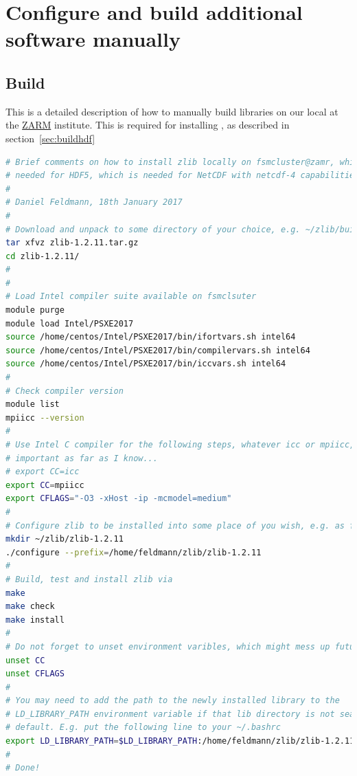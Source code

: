 \documentclass[a4paper, 11pt, DIV=11]{scrartcl}
\begin{document}
 
















\section{Configure and build additional software manually}
\label{app:selfBuildLibraries}

\subsection{Build }
\label{sec:buildzlib}

This is a detailed description of how to manually build 
libraries on our local  at the
\href{https://www.zarm.uni-bremen.de/en/}{ZARM} institute. This is required
for installing \hdf, as described in section~\ref{sec:buildhdf}

\begin{lstlisting}[language=bash]
# Brief comments on how to install zlib locally on fsmcluster@zamr, which is
# needed for HDF5, which is needed for NetCDF with netcdf-4 capabilities.
#
# Daniel Feldmann, 18th January 2017
# 
# Download and unpack to some directory of your choice, e.g. ~/zlib/build
tar xfvz zlib-1.2.11.tar.gz
cd zlib-1.2.11/
#
#
# Load Intel compiler suite available on fsmclsuter
module purge
module load Intel/PSXE2017
source /home/centos/Intel/PSXE2017/bin/ifortvars.sh intel64
source /home/centos/Intel/PSXE2017/bin/compilervars.sh intel64
source /home/centos/Intel/PSXE2017/bin/iccvars.sh intel64
#
# Check compiler version
module list
mpiicc --version
#
# Use Intel C compiler for the following steps, whatever icc or mpiicc, is not
# important as far as I know...
# export CC=icc
export CC=mpiicc
export CFLAGS="-O3 -xHost -ip -mcmodel=medium"
#
# Configure zlib to be installed into some place of you wish, e.g. as follows 
mkdir ~/zlib/zlib-1.2.11
./configure --prefix=/home/feldmann/zlib/zlib-1.2.11 
#
# Build, test and install zlib via
make
make check
make install
#
# Do not forget to unset environment varibles, which might mess up future builds
unset CC
unset CFLAGS
#
# You may need to add the path to the newly installed library to the
# LD_LIBRARY_PATH environment variable if that lib directory is not searched by
# default. E.g. put the following line to your ~/.bashrc
export LD_LIBRARY_PATH=$LD_LIBRARY_PATH:/home/feldmann/zlib/zlib-1.2.11/lib
# 
# Done!
\end{lstlisting}
\end{document}
